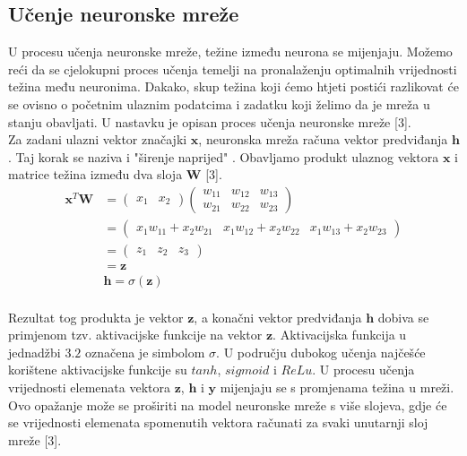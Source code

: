 \documentclass[times, utf8, zavrsni]{fer}
\begin{document}
\subsection*{Učenje neuronske mreže}

\indent{}
U procesu učenja neuronske mreže, težine između neurona se mijenjaju. Možemo reći da se cjelokupni proces učenja temelji na pronalaženju optimalnih vrijednosti težina među neuronima. Dakako, skup težina koji ćemo htjeti postići razlikovat će se ovisno o početnim ulaznim podatcima i zadatku koji želimo da je mreža u stanju obavljati. U nastavku je opisan proces učenja neuronske mreže [3].\\
\indent{}
Za zadani ulazni vektor značajki $\mathbf{x}$, neuronska mreža računa vektor predviđanja $\mathbf{h}$. Taj korak se naziva i "širenje naprijed" . Obavljamo produkt ulaznog vektora $\mathbf{x}$ i matrice težina između dva sloja $\mathbf{W}$ [3]. \\
%
\begin{equation}
\begin{split}
\mathbf{x}^T 
\mathbf{W} 
&= 
\begin{pmatrix}
x_{1} & x_{2}
\end{pmatrix}
\begin{pmatrix}
w_{11} & w_{12} & w_{13}\\
w_{21} & w_{22} & w_{23}
\end{pmatrix}
\\
&=
\begin{pmatrix}
x_{1}w_{11} + x_{2}w_{21} & x_{1}w_{12} + x_{2}w_{22} & x_{1}w_{13} + x_{2}w_{23}
\end{pmatrix}
\\
&=
\begin{pmatrix}
z_{1} & z_{2} & z_{3}
\end{pmatrix}
\\
&=
\mathbf{z}
\\
&
\mathbf{h} = \sigma(\mathbf{z})
\end{split}
\end{equation}
\\
Rezultat tog produkta je vektor $\mathbf{z}$, a konačni vektor predviđanja $\mathbf{h}$ dobiva se primjenom tzv. aktivacijske funkcije  na vektor $\mathbf{z}$. Aktivacijska funkcija u jednadžbi $3.2$ označena je simbolom $\sigma$. U području dubokog učenja najčešće korištene aktivacijske funkcije su $tanh$, $sigmoid$ i $ReLu$. U procesu učenja vrijednosti elemenata vektora $\mathbf{z}$, $\mathbf{h}$ i $\mathbf{y}$ mijenjaju se s promjenama težina u mreži. Ovo opažanje može se proširiti na model neuronske mreže s više slojeva, gdje će se vrijednosti elemenata spomenutih vektora računati za svaki unutarnji sloj mreže [3]. 
\end{document}
